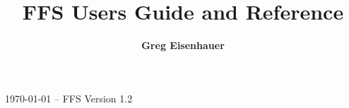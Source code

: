 \documentclass{article}
\title{FFS Users Guide and Reference}
\author{ {\large\bf Greg Eisenhauer }\\
}
\begin{document}

\maketitle
\begin{center}
\today{} -- FFS Version 1.2
\end{center}
\thispagestyle{empty}

\end{document}
